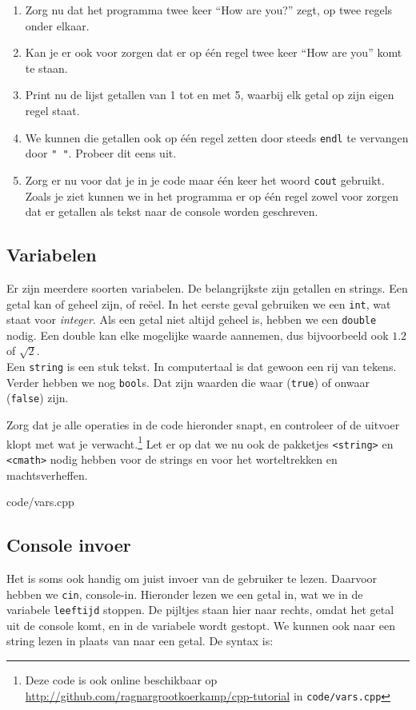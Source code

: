 \documentclass[12pt,a4paper]{article}
\newcommand{\code}{}
\newcommand{\icode}{\lstinline}
\newcommand{\mono}{\texttt}
\begin{document}
\begin{enumerate}
		\item
			Zorg nu dat het programma twee keer ``How are you?'' zegt, op twee regels onder elkaar.
		\item
			Kan je er ook voor zorgen dat er op \'e\'en regel twee keer ``How are you'' komt te staan.
		\item
			Print nu de lijst getallen van 1 tot en met 5, waarbij elk getal op zijn eigen regel staat.
		\item
			We kunnen die getallen ook op \'e\'en regel zetten door steeds \icode{endl} te vervangen door \icode{" "}. Probeer dit eens uit.
		\item
			Zorg er nu voor dat je in je code maar \'e\'en keer het woord \icode{cout} gebruikt.
			Zoals je ziet kunnen we in het programma er op \'e\'en regel zowel voor zorgen dat er getallen als tekst naar de console worden geschreven. 
\end{enumerate}

\subsection{Variabelen}
Er zijn meerdere soorten variabelen. De belangrijkste zijn getallen en strings. Een getal kan of geheel zijn, of re\"eel. In het eerste geval gebruiken we een \icode{int}, wat staat voor \emph{integer}. Als een getal niet altijd geheel is, hebben we een \icode{double} nodig. Een double kan elke mogelijke waarde aannemen, dus bijvoorbeeld ook $1.2$ of $\sqrt 2$.\\
Een \icode{string} is een stuk tekst. In computertaal is dat gewoon een rij van tekens. Verder hebben we nog \icode{bool}s. Dat zijn waarden die waar (\icode{true}) of onwaar (\icode{false}) zijn.

Zorg dat je alle operaties in de code hieronder snapt, en controleer of de uitvoer klopt met wat je verwacht.\footnote{Deze code is ook online beschikbaar op \url{http://github.com/ragnargrootkoerkamp/cpp-tutorial} in \mono{code/vars.cpp}}
Let er op dat we nu ook de pakketjes \icode{<string>} en \icode{<cmath>} nodig hebben voor de strings en voor het worteltrekken en machtsverheffen.

\code{code/vars.cpp}


\subsection{Console invoer}
Het is soms ook handig om juist invoer van de gebruiker te lezen. Daarvoor hebben we \icode{cin}, console-in. Hieronder lezen we een getal in, wat we in de variabele \icode{leeftijd} stoppen. De pijltjes staan hier naar rechts, omdat het getal uit de console komt, en in de variabele wordt gestopt. We kunnen ook naar een string lezen in plaats van naar een getal. De syntax is: \\
\end{document}
